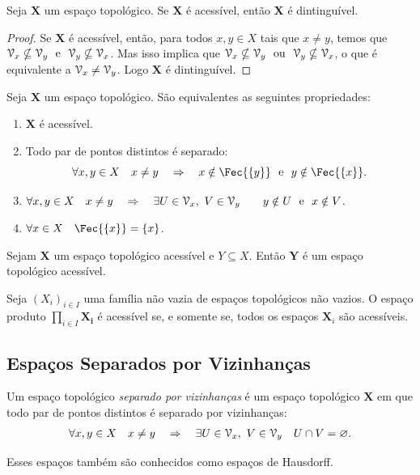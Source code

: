 \begin{prop}[$T_1 \Rightarrow T_0$]
Seja $\bm X$ um espaço topológico. Se $\bm X$ é acessível, então $\bm X$ é dintinguível.
\end{prop}
\begin{proof}
Se $\bm X$ é acessível, então, para todos $x,y \in X$ tais que $x \neq y$, temos que $\mathcal{V}_x \nsubseteq \mathcal{V}_y \text{\ \ e\ \ } \mathcal{V}_y \nsubseteq \mathcal{V}_x$. Mas isso implica que $\mathcal{V}_x \nsubseteq \mathcal{V}_y \text{\ \ ou\ \ } \mathcal{V}_y \nsubseteq \mathcal{V}_x$, o que é equivalente a $\mathcal{V}_x \neq \mathcal{V}_y$. Logo $\bm X$ é dintinguível.
\end{proof}

\begin{prop}
Seja $\bm X$ um espaço topológico. São equivalentes as seguintes propriedades:
	\begin{enumerate}
	\item $\bm X$ é acessível.
	\item Todo par de pontos distintos é separado:
		\begin{equation*}
		\forall x,y \in X \quad x \neq y \quad \Rightarrow \quad x \notin \Fec{\{y\}} \e y \notin \Fec{\{x\}}.
		\end{equation*}
	\item $\forall x,y \in X \quad x \neq y \quad \Rightarrow \quad \exists U \in \mathcal{V}_x,\ V \in \mathcal{V}_y \qquad y \notin U \text{\ \ e\ \ } x \notin V$.
	\item $\forall x \in X \quad \Fec{\{x\}}=\{x\}$.
	\end{enumerate}
\end{prop}

\begin{prop}
Sejam $\bm X$ um espaço topológico acessível e  $Y \subseteq X$. Então $\bm Y$ é um espaço topológico acessível.
\end{prop}

\begin{prop}
Seja $(X_i)_{i \in I}$ uma família não vazia de espaços topológicos não vazios. O espaço produto $\prod_{i \in I} \bm{X_i}$ é acessível se, e somente se, todos os espaços $\bm X_i$ são acessíveis.
\end{prop}

\subsection{Espaços Separados por Vizinhanças}

\begin{defi}[$T_2$]
Um espaço topológico \emph{separado por vizinhanças} é um espaço topológico $\bm X$ em que todo par de pontos distintos é separado por vizinhanças:
	\begin{equation*}
	\forall x,y \in X \quad x \neq y \quad \Rightarrow \quad \exists U \in \mathcal{V}_x,\ V \in \mathcal{V}_y \quad U \cap V = \varnothing.
	\end{equation*}
\end{defi}
Esses espaços também são conhecidos como espaços de Hausdorff.

